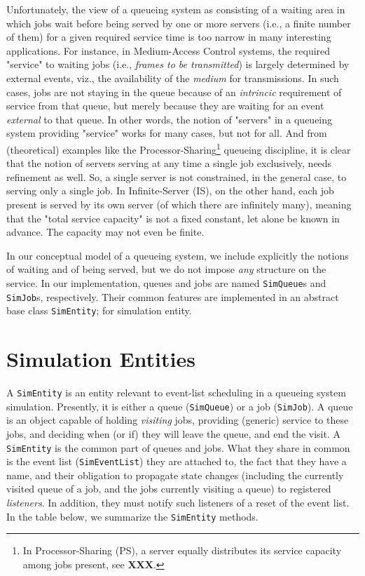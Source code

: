 \documentclass[12pt]{book}
\begin{document}
Unfortunately,
  the view of a queueing system as consisting of a waiting area
  in which jobs wait before being served by one or more servers
  (i.e., a finite number of them)
  for a given required service time is too narrow in many
  interesting applications.
For instance, in Medium-Access Control systems,
  the required "service" to waiting jobs
  (i.e., {\em frames to be transmitted\/})
  is largely determined by external events,
  viz.,
  the availability of the {\em medium\/} for transmissions.
In such cases, jobs are not staying in the queue because of an
  {\em intrincic\/} requirement of service from that queue,
  but merely because they are waiting for an event {\em external\/}
  to that queue.
In other words, the notion of "servers" in a queueing system
  providing "service" works for many cases, but not for all.
And from (theoretical) examples like the Processor-Sharing\footnote{
In Processor-Sharing (PS),
  a server equally distributes its service capacity
  among jobs present, see {\bf XXX}.}
  queueing discipline,
  it is clear that the notion of servers serving
  at any time a single job exclusively,
  needs refinement as well.
So, a single server is not constrained,
  in the general case,
  to serving only a single job.
In Infinite-Server (IS), on the other hand,
  each job present is served by its own server
  (of which there are infinitely many),
  meaning that the "total service capacity"
  is not a fixed constant, let alone be known in advance.
The capacity may not even be finite.

In our conceptual model of a queueing system,
  we include explicitly the notions of waiting and of being served,
  but we do not impose {\em any\/} structure on the service.
In our implementation, queues and jobs are
  named \lstinline-SimQueue-s and \lstinline-SimJob-s, respectively.
Their common features are implemented in an abstract base class
  \lstinline-SimEntity-; for simulation entity.

\section{Simulation Entities}

A \lstinline-SimEntity-
  is an entity relevant to event-list scheduling in a queueing system simulation.
Presently, it is either a queue (\lstinline-SimQueue-) or a job (\lstinline-SimJob-).
A queue is an object capable of holding {\em visiting\/} jobs,
  providing (generic) service to these jobs,
  and deciding when (or if) they will leave the queue,
  and end the visit.
A \lstinline-SimEntity- is the common part of queues and jobs.
What they share in common is the event list (\lstinline-SimEventList-) they are attached to,
  the fact that they have a name,
  and their obligation to propagate
  state changes
    (including the currently visited queue of a job,
    and the jobs currently visiting a queue)
  to registered {\em listeners}.
In addition,
  they must notify such listeners of a reset of the event list.
In the table below, we summarize the \lstinline-SimEntity- methods.
\end{document}
